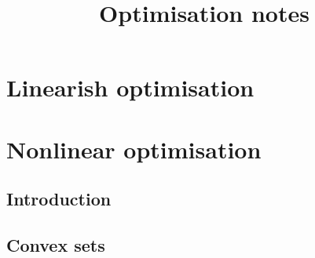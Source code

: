 \documentclass{bookest}
\title{Optimisation notes}
\begin{document}
	\maketitle

	\tableofcontents
	
	\part{Linearish optimisation}
	
	\part{Nonlinear optimisation}
		
	\chapter{Introduction}
	
	
	\chapter{Convex sets}
	
	
\end{document}

